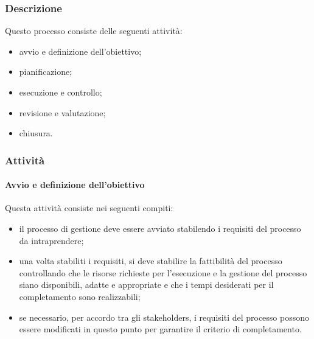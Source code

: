 		\subsubsection{Descrizione}
		Questo processo consiste delle seguenti attività:
		\begin{itemize}
			\item avvio e definizione dell'obiettivo;
			\item pianificazione;
			\item esecuzione e controllo;
			\item revisione e valutazione;
			\item chiusura.
		\end{itemize}
		\subsubsection{Attività}
		\paragraph{Avvio e definizione dell'obiettivo}
		Questa attività consiste nei seguenti compiti:
		\begin{itemize}
			\item il processo di gestione deve essere avviato stabilendo i requisiti del processo da intraprendere;
			\item una volta stabiliti i requisiti, si deve stabilire la fattibilità del processo controllando che le risorse richieste per l'esecuzione e la gestione del processo siano disponibili, adatte e appropriate e che i tempi desiderati per il completamento sono realizzabili;
			\item se necessario, per accordo tra gli stakeholders\glo, i requisiti del processo possono essere modificati in questo punto per garantire il criterio di completamento.
		\end{itemize}
